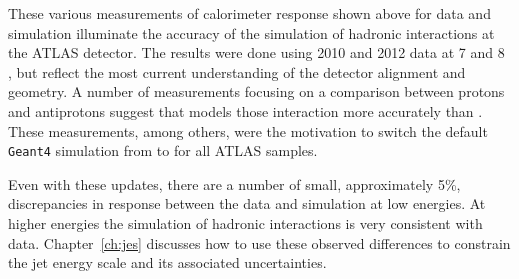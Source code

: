 These various measurements of calorimeter response shown above for data and simulation illuminate the accuracy of the simulation of hadronic interactions at the ATLAS detector. 
The results were done using 2010 and 2012 data at 7 and 8 \TeV, but reflect the most current understanding of the detector alignment and geometry.
A number of measurements focusing on a comparison between protons and antiprotons suggest that \FTFP models those interaction more accurately than \QGSP.
These measurements, among others, were the motivation to switch the default \texttt{Geant4} simulation from \FTFP to \QGSP for all ATLAS samples. 

Even with these updates, there are a number of small, approximately 5\%, discrepancies in response between the data and simulation at low energies.
At higher energies the simulation of hadronic interactions is very consistent with data. 
Chapter~\ref{ch:jes} discusses how to use these observed differences to constrain the jet energy scale and its associated uncertainties.
